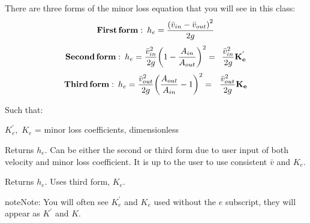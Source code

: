 \documentclass[letterpaper,10pt,english]{sphinxmanual}
\begin{document}
There are three forms of the minor loss equation that you will see in this class:
\begin{equation}\label{equation:Fluids_Review/Fluids_Review_Design:Fluids_Review/Fluids_Review_Design:18}
\begin{split}{\rm{ \mathbf{First \, form:} }} \,\,\, h_e = \frac{\left( \bar v_{in}  - \bar v_{out} \right)^2}{2g}\end{split}
\end{equation}\begin{equation}\label{equation:Fluids_Review/Fluids_Review_Design:Fluids_Review/Fluids_Review_Design:19}
\begin{split}{\rm{ \mathbf{Second \, form:} }} \,\,\, h_e = \frac{\bar v_{in}^2}{2g}{\left( {1 - \frac{A_{in}}{A_{out}}} \right)^2} = \,\,\, \frac{\bar v_{in}^2}{2g} \mathbf{K_e^{'}}\end{split}
\end{equation}\begin{equation}\label{equation:Fluids_Review/Fluids_Review_Design:Fluids_Review/Fluids_Review_Design:20}
\begin{split}{\rm{ \mathbf{Third \, form:} }} \,\,\, h_e = \frac{\bar v_{out}^2}{2g}{\left( {\frac{A_{out}}{A_{in}}} -1 \right)^2} = \,\,\,\, \frac{\bar v_{out}^2}{2g} \mathbf{K_e}\end{split}
\end{equation}
\begin{DUlineblock}{0em}
\item[] Such that:
\item[] \(K_e^{'}, \,\, K_e\) = minor loss coefficients, dimensionless
\end{DUlineblock}




  Returns \(h_e\). Can be either the second or third form due to user input of both velocity and minor loss coefficient. It is up to the user to use consistent \(\bar v\) and \(K_e\).






  Returns \(h_e\). Uses third form, \(K_e\).



\begin{sphinxadmonition}{note}{Note:}
You will often see \(K_e^{'}\) and \(K_e\) used without the \(e\) subscript, they will appear as \(K^{'}\) and \(K\).
\end{sphinxadmonition}
\end{document}
